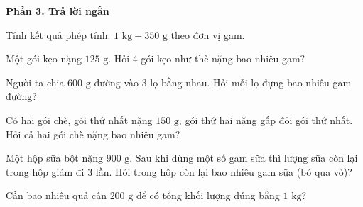 \textbf{Phần 3. Trả lời ngắn}

\begin{ex} %
Tính kết quả phép tính: $1\text{ kg} - 350\text{ g}$ theo đơn vị gam.
\end{ex}

\begin{ex} %
Một gói kẹo nặng $125\text{ g}$. Hỏi 4 gói kẹo như thế nặng bao nhiêu gam?
\end{ex}

\begin{ex} %
Người ta chia $600\text{ g}$ đường vào 3 lọ bằng nhau. Hỏi mỗi lọ đựng bao nhiêu gam đường?
\end{ex}

\begin{ex} %
Có hai gói chè, gói thứ nhất nặng $150\text{ g}$, gói thứ hai nặng gấp đôi gói thứ nhất. Hỏi cả hai gói chè nặng bao nhiêu gam?
\end{ex}

\begin{ex} %
Một hộp sữa bột nặng $900\text{ g}$. Sau khi dùng một số gam sữa thì lượng sữa còn lại trong hộp giảm đi 3 lần. Hỏi trong hộp còn lại bao nhiêu gam sữa (bỏ qua vỏ)?
\end{ex}

\begin{ex} %
Cần bao nhiêu quả cân $200\text{ g}$ để có tổng khối lượng đúng bằng $1\text{ kg}$?
\end{ex}
